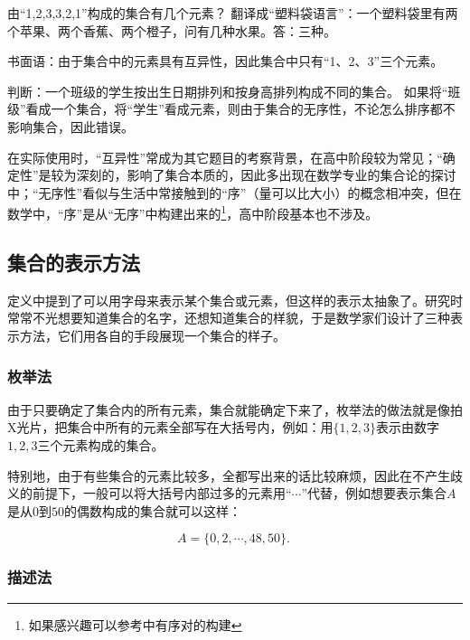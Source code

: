 \begin{example}{由“1,2,3,3,2,1”构成的集合有几个元素？}
翻译成“塑料袋语言”：一个塑料袋里有两个苹果、两个香蕉、两个橙子，问有几种水果。答：三种。

书面语：由于集合中的元素具有互异性，因此集合中只有“1、2、3”三个元素。
\end{example}

\begin{example}{判断：一个班级的学生按出生日期排列和按身高排列构成不同的集合。}
如果将“班级”看成一个集合，将“学生”看成元素，则由于集合的无序性，不论怎么排序都不影响集合，因此错误。
\end{example}

在实际使用时，“互异性”常成为其它题目的考察背景，在高中阶段较为常见；“确定性”是较为深刻的，影响了集合本质的，因此多出现在数学专业的集合论的探讨中；“无序性”看似与生活中常接触到的“序”（量可以比大小）的概念相冲突，但在数学中，“序”是从“无序”中构建出来的\footnote{如果感兴趣可以参考中有序对的构建}，高中阶段基本也不涉及。

\subsection{集合的表示方法}

定义中提到了可以用字母来表示某个集合或元素，但这样的表示太抽象了。研究时常常不光想要知道集合的名字，还想知道集合的样貌，于是数学家们设计了三种表示方法，它们用各自的手段展现一个集合的样子。

\subsubsection{枚举法}

由于只要确定了集合内的所有元素，集合就能确定下来了，枚举法的做法就是像拍X光片，把集合中所有的元素全部写在大括号内，例如：用$\{1,2,3\}$表示由数字$1,2,3$三个元素构成的集合。

特别地，由于有些集合的元素比较多，全都写出来的话比较麻烦，因此在不产生歧义的前提下，一般可以将大括号内部过多的元素用“$\cdots$”代替，例如想要表示集合$A$是从$0$到$50$的偶数构成的集合就可以这样：

\begin{equation}
A=\{0,2, \cdots ,48,50\}.~
\end{equation}


\subsubsection{描述法}

